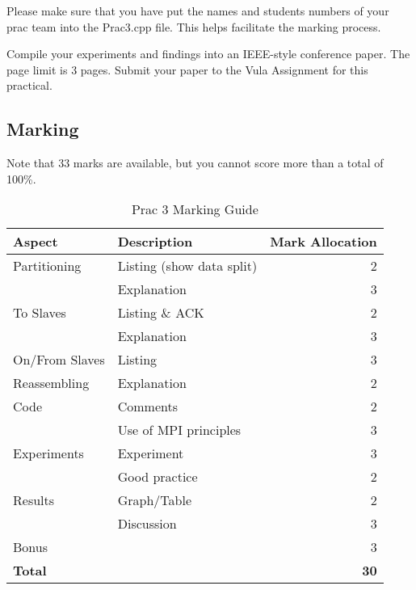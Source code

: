 Please make sure that you have put the names and students numbers of your prac team into the Prac3.cpp file. This helps facilitate the marking process.

Compile your experiments and findings into an IEEE-style conference paper. 
The page limit is 3 pages. Submit your paper to the Vula Assignment for this practical.

\subsection{Marking}
Note that 33 marks are available, but you cannot score more than a total of 100\%.
\begin{table}[H]
\centering
\caption{Prac 3 Marking Guide}
\label{tbl:Prac3Marks}
\begin{tabular}{|l|l|r|}
\hline
\textbf{Aspect} & \textbf{Description} & \multicolumn{1}{l|}{\textbf{Mark Allocation}} \\ \hline
Partitioning & Listing (show data split) & 2 \\ \hline
 & Explanation & 3 \\ \hline
To Slaves & Listing \& ACK & 2 \\ \hline
 & Explanation & 3 \\ \hline
On/From Slaves & Listing & 3 \\ \hline
Reassembling & Explanation & 2 \\ \hline
Code & Comments & 2 \\ \hline
 & Use of MPI principles & 3 \\ \hline
Experiments & Experiment & 3 \\ \hline
 & Good practice & 2 \\ \hline
Results & Graph/Table & 2 \\ \hline
 & Discussion & 3 \\ \hline
Bonus &  & 3 \\ \hline
\textbf{Total} &  & \textbf{30} \\ \hline
\end{tabular}
\end{table}